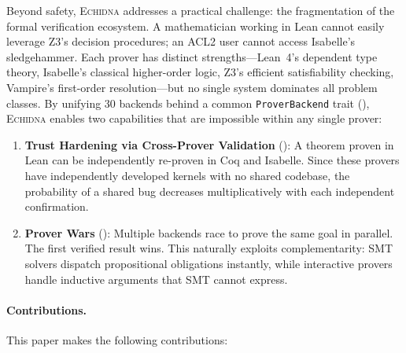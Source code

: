 \documentclass[11pt,a4paper]{article}
\newcommand{\echidna}{\textsc{Echidna}}
\newcommand{\proverbackend}{\texttt{ProverBackend}}
\begin{document}
Beyond safety, \echidna{} addresses a practical challenge: the fragmentation
of the formal verification ecosystem. A mathematician working in Lean cannot
easily leverage Z3's decision procedures; an ACL2 user cannot access Isabelle's
sledgehammer. Each prover has distinct strengths---Lean~4's dependent type
theory, Isabelle's classical higher-order logic, Z3's efficient satisfiability
checking, Vampire's first-order resolution---but no single system dominates all
problem classes. By unifying 30 backends behind a common
\proverbackend{} trait (), \echidna{} enables
two capabilities that are impossible within any single prover:

\begin{enumerate}[label=(\roman*)]
  \item \textbf{Trust Hardening via Cross-Prover Validation}
  (): A theorem proven in Lean can be
  independently re-proven in Coq and Isabelle. Since these provers have
  independently developed kernels with no shared codebase, the probability
  of a shared bug decreases multiplicatively with each independent
  confirmation.

  \item \textbf{Prover Wars} (): Multiple backends
  race to prove the same goal in parallel. The first verified result wins.
  This naturally exploits complementarity: SMT solvers dispatch
  propositional obligations instantly, while interactive provers handle
  inductive arguments that SMT cannot express.
\end{enumerate}

\paragraph{Contributions.} This paper makes the following contributions:
\end{document}
